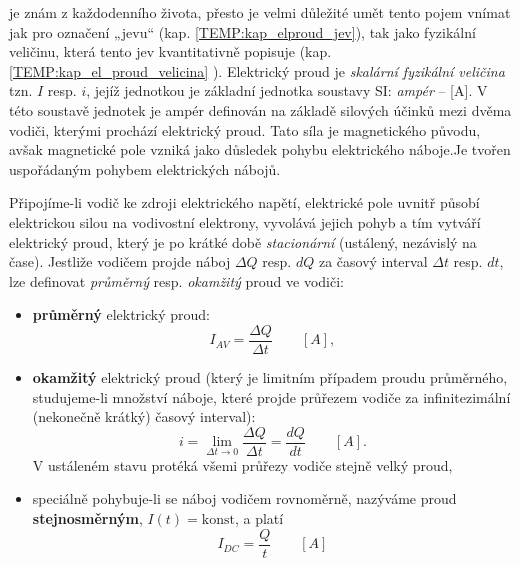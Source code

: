 {      \vspace{1em}
      \label{TEMP:kap_el_proud_velicina} je znám z každodenního života,
        přesto je velmi důležité umět tento pojem vnímat jak pro označení „jevu“ (kap.
        \ref{TEMP:kap_elproud_jev}), tak jako fyzikální veličinu, která tento jev kvantitativně
        popisuje (kap. \ref{TEMP:kap_el_proud_velicina} ). Elektrický proud je \emph{skalární
        fyzikální veličina} tzn. $I$ resp. $i$, jejíž jednotkou je základní jednotka soustavy SI:
        \emph{ampér} – [A]. V této soustavě jednotek je ampér definován na základě silových
        účinků mezi dvěma vodiči, kterými prochází elektrický proud. Tato síla je magnetického
        původu, avšak magnetické pole vzniká jako důsledek pohybu elektrického náboje.Je tvořen
        uspořádaným pohybem elektrických nábojů.
        
        Připojíme-li vodič ke zdroji elektrického napětí, elektrické pole uvnitř působí elektrickou
        silou na vodivostní elektrony, vyvolává jejich pohyb a tím vytváří elektrický proud, který
        je po krátké době \emph{stacionární} (ustálený, nezávislý na čase). Jestliže vodičem projde
        náboj $\Delta Q$ resp. $dQ$ za časový interval $\Delta t$ resp. $dt$, lze definovat
        \emph{průměrný} resp. \emph{okamžitý} proud ve vodiči:
        \begin{itemize}\addtolength{\itemsep}{-0.5\baselineskip}
          \item \textbf{průměrný} elektrický proud: $$I_{AV} = \frac{\Delta Q}{\Delta t}
                \qquad[A],$$
          \item \textbf{okamžitý} elektrický proud (který je limitním případem proudu průměrného,
                studujeme-li množství náboje, které projde průřezem vodiče za infinitezimální
                (nekonečně krátký) časový interval): $$i = \lim_{\Delta t \rightarrow 0}\frac{\Delta
                Q}{\Delta t} = \frac{dQ}{dt} \qquad[A].$$ V ustáleném stavu protéká všemi průřezy
                vodiče stejně velký proud,
          \item speciálně pohybuje-li se náboj vodičem rovnoměrně, nazýváme proud
                \textbf{stejno\-směr\-ným}, $I(t) = \text{konst}$, a platí $$ I_{DC} =
                \frac{Q}{t}\qquad[A] $$
        \end{itemize}        

}
